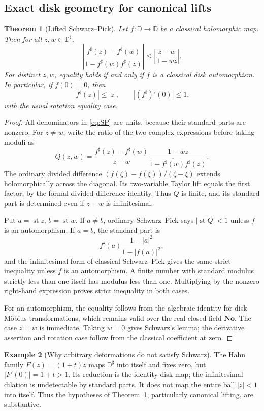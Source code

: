 \documentclass[11pt,a4paper]{article}
\newtheorem{theorem}{Theorem}[section]
\theoremstyle{definition}
\newtheorem{example}[theorem]{Example}
\theoremstyle{remark}
\newcommand{\No}{\mathbf{No}}
\newcommand{\st}{\operatorname{st}}
\newcommand{\abs}[1]{\left|#1\right|}
\newcommand{\disk}{\mathbb D}
\begin{document}
\subsection{Exact disk geometry for canonical lifts}
\begin{theorem}[Lifted Schwarz--Pick]\label{thm:SP}
Let $f:\disk\to\disk$ be a classical holomorphic map. Then for
all $z,w\in\disk^\sharp$,
\begin{equation}\label{eq:SP}
 \abs{\frac{f^\sharp(z)-f^\sharp(w)}
 {1-\overline{f^\sharp(w)}f^\sharp(z)}}
 \le
 \abs{\frac{z-w}{1-\overline w z}}.
\end{equation}
For distinct $z,w$, equality holds if and only if $f$ is a classical
disk automorphism. In particular, if $f(0)=0$, then
\[
 |f^\sharp(z)|\le|z|,\qquad |(f^\sharp)'(0)|\le1,
\]
with the usual rotation equality case.
\end{theorem}
\begin{proof}
All denominators in \eqref{eq:SP} are units, because their standard
parts are nonzero. For $z\ne w$, write the ratio of the two
complex expressions before taking moduli as
\[
 Q(z,w)=\frac{f^\sharp(z)-f^\sharp(w)}{z-w}
          \frac{1-\overline w z}
          {1-\overline{f^\sharp(w)}f^\sharp(z)}.
\]
The ordinary divided difference
$(f(\zeta)-f(\xi))/(\zeta-\xi)$ extends holomorphically across
the diagonal. Its two-variable Taylor lift equals the first factor,
by the formal divided-difference identity. Thus $Q$ is finite, and
its standard part is determined even if $z-w$ is infinitesimal.

Put $a=\st z$, $b=\st w$. If $a\ne b$, ordinary Schwarz--Pick
says $|\st Q|<1$ unless $f$ is an automorphism. If $a=b$, the
standard part is
\[
 f'(a)\frac{1-|a|^2}{1-|f(a)|^2},
\]
and the infinitesimal form of classical Schwarz--Pick gives the same
strict inequality unless $f$ is an automorphism. A finite number with
standard modulus strictly less than one itself has modulus less than
one. Multiplying by the nonzero right-hand expression proves strict
inequality in both cases.

For an automorphism, the equality follows from the algebraic identity
for disk M\"obius transformations, which remains valid over the real
closed field $\No$. The case $z=w$ is immediate. Taking $w=0$
gives Schwarz's lemma; the derivative assertion and rotation case
follow from the classical coefficient at zero.
\end{proof}

\begin{example}[Why arbitrary deformations do not satisfy Schwarz]
The Hahn family $F(z)=(1+t)z$ maps $\disk^\sharp$ into itself and
fixes zero, but $|F'(0)|=1+t>1$. Its reduction is the identity disk
map; the infinitesimal dilation is undetectable by standard parts.
It does not map the entire ball $|z|<1$ into itself. Thus the
hypotheses of Theorem~\ref{thm:SP}, particularly canonical lifting,
are substantive.
\end{example}
\end{document}
